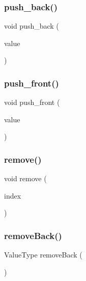 \mbox{\label{classLinkedList_a8ff6f18ca45e769f2f8c7a0bcf79fad9}} 
\subsubsection{\texorpdfstring{push\+\_\+back()}{push\_back()}}
{\footnotesize\ttfamily void push\+\_\+back (\begin{DoxyParamCaption}\item[{const Value\+Type \&}]{value }\end{DoxyParamCaption})}

\mbox{\label{classLinkedList_a9737dc314198d1cf306325134f000c5a}} 
\subsubsection{\texorpdfstring{push\+\_\+front()}{push\_front()}}
{\footnotesize\ttfamily void push\+\_\+front (\begin{DoxyParamCaption}\item[{const Value\+Type \&}]{value }\end{DoxyParamCaption})}

\mbox{\label{classLinkedList_a2ad1aa316f278b2e9fa8121504749652}} 
\subsubsection{\texorpdfstring{remove()}{remove()}}
{\footnotesize\ttfamily void remove (\begin{DoxyParamCaption}\item[{int}]{index }\end{DoxyParamCaption})}

\mbox{\label{classLinkedList_af7878e9c2f67e06cbae525e9fa77e38e}} 
\subsubsection{\texorpdfstring{remove\+Back()}{removeBack()}}
{\footnotesize\ttfamily Value\+Type remove\+Back (\begin{DoxyParamCaption}{ }\end{DoxyParamCaption})}

